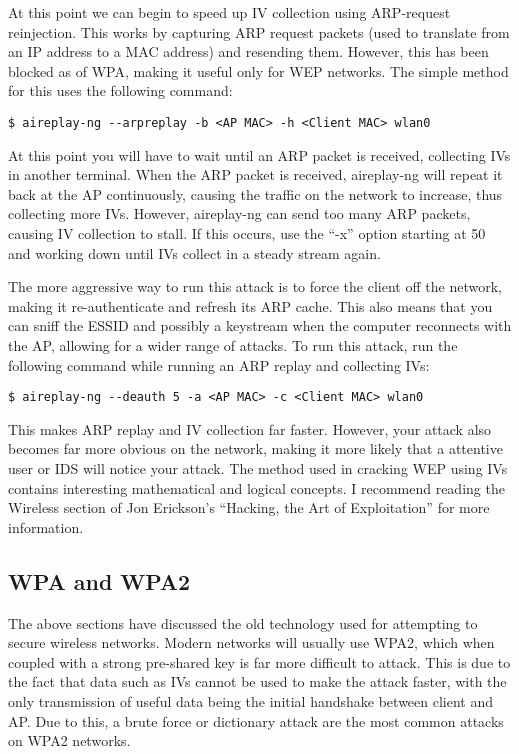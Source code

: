 			At this point we can begin to speed up IV collection using ARP-request reinjection. 
			This works by capturing ARP request packets (used to translate from an IP address to a MAC address) and resending them. 
			However, this has been blocked as of WPA, making it useful only for WEP networks.
			The simple method for this uses the following command:
			\begin{lstlisting}[style=CLI]
				$ aireplay-ng --arpreplay -b <AP MAC> -h <Client MAC> wlan0
			\end{lstlisting}
			At this point you will have to wait until an ARP packet is received, collecting IVs in another terminal. 
			When the ARP packet is received, aireplay-ng will repeat it back at the AP continuously, causing the traffic on the network to increase, thus collecting more IVs. 
			However, aireplay-ng can send too many ARP packets, causing IV collection to stall. 
			If this occurs, use the ``-x'' option starting at 50 and working down until IVs collect in a steady stream again. 

			The more aggressive way to run this attack is to force the client off the network, making it re-authenticate and refresh its ARP cache. 
			This also means that you can sniff the ESSID and possibly a keystream when the computer reconnects with the AP, allowing for a wider range of attacks. 
			To run this attack, run the following command while running an ARP replay and collecting IVs:
			\begin{lstlisting}[style=CLI]
				$ aireplay-ng --deauth 5 -a <AP MAC> -c <Client MAC> wlan0
			\end{lstlisting}
			This makes ARP replay and IV collection far faster.
			However, your attack also becomes far more obvious on the network, making it more likely that a attentive user or IDS will notice your attack. 
			The method used in cracking WEP using IVs contains interesting mathematical and logical concepts. 
			I recommend reading the Wireless section of Jon Erickson's ``Hacking, the Art of Exploitation''\cite{HackingAOE} for more information.
			
		\subsection{WPA and WPA2}
			The above sections have discussed the old technology used for attempting to secure wireless networks. 
			Modern networks will usually use WPA2, which when coupled with a strong pre-shared key is far more difficult to attack. 
			This is due to the fact that data such as IVs cannot be used to make the attack faster, with the only transmission of useful data being the initial handshake between client and AP. 
			Due to this, a brute force or dictionary attack are the most common attacks on WPA2 networks. 

